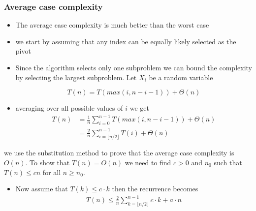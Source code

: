 \documentclass{beamer}
\begin{document}
\begin{frame}
	\frametitle{Average case complexity}
	
	\begin{itemize}
		\item The average case complexity is much better than the worst case
		\item we start by assuming that any index can be equally likely selected as the pivot
		\item Since the algorithm selects only one subproblem we can bound the complexity by selecting the largest subproblem. Let $X_i$ be a random variable

	\begin{displaymath}
		T(n)=T(max(i,n-i-1))+\Theta(n)
	\end{displaymath}
	\item averaging over all possible values of $i$ we get
	\begin{align*}
		T(n)&=\frac{1}{n}\sum_{i=0}^{n-1}T(max(i,n-i-1))+\Theta(n)\\
		    &=\frac{2}{n}\sum_{i=\lfloor n/2\rfloor}^{n-1}T(i)+\Theta(n)
	\end{align*}
	
	\end{itemize}
	
\end{frame}

\begin{frame}
we use the substitution method to prove that the average case complexity is $O(n)$. To show that $T(n)=O(n)$ we need to find $c>0$ and $n_0$ such that $T(n)\le c n$ for all $n\ge n_0$.

\begin{itemize}
\item Now assume that $T(k)\le c\cdot k$ then the recurrence becomes
\begin{align*}
T(n)\le\frac{2}{n}\sum_{k=\lfloor n/2\rfloor}^{n-1}c\cdot k+a\cdot n	
\end{align*}

	
\end{itemize}

\end{frame}
\end{document}
